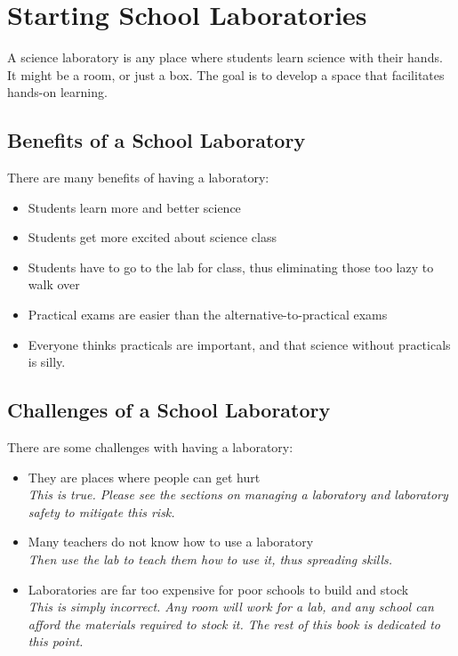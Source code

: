 \chapter{Starting School Laboratories}

A science laboratory is any place 
where students learn science with their hands. 
It might be a room, 
or just a box. 
The goal is to develop a space that facilitates hands-on learning.

\section{Benefits of a School Laboratory}
There are many benefits of having a laboratory:
\begin{itemize}
\item{Students learn more and better science}
\item{Students get more excited about science class}
\item{Students have to go to the lab for class, 
thus eliminating those too lazy to walk over}
\item{Practical exams are easier than the alternative-to-practical exams}
\item{Everyone thinks practicals are important, 
and that science without practicals is silly.}
\end{itemize}

\section{Challenges of a School Laboratory}
There are some challenges with having a laboratory:
\begin{itemize}
\item{They are places where people can get hurt\\
\textit{This is true. 
Please see the sections on managing a laboratory and laboratory safety 
to mitigate this risk.}}
\item{Many teachers do not know how to use a laboratory\\
\textit{Then use the lab to teach them how to use it, thus spreading skills.}}
\item{Laboratories are far too expensive for poor schools to build and stock\\
\textit{This is simply incorrect. 
Any room will work for a lab, 
and any school can afford the materials required to stock it. 
The rest of this book is dedicated to this point.}}
\end{itemize}

